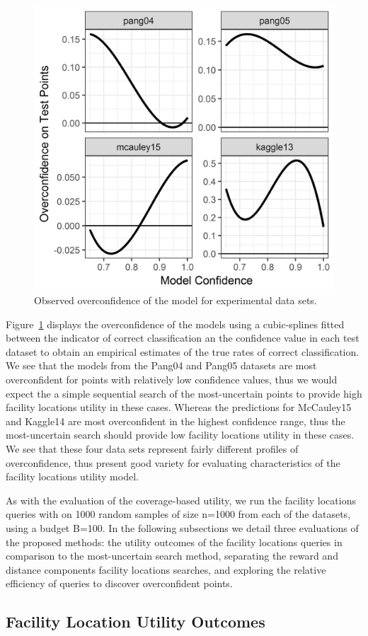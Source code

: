 \documentclass[letterpaper]{article} %
\newcommand{\km}[1]{{\color{red} #1}} %
\begin{document}
\begin{figure}[hbtp]
  \includegraphics[width=.45\textwidth]{../experimentsAndPlots/overconfidence.png}
  \caption{Observed overconfidence of the model for experimental data sets.}
  \label{fig:overconf}
\end{figure}

Figure~\ref{fig:overconf} displays the overconfidence of the models using a cubic-splines fitted between the indicator of correct classification an the confidence value in each test dataset to obtain an empirical estimates of the true rates of correct classification. We see that the models from the Pang04 and Pang05 datasets are most overconfident for points with relatively low confidence values, thus we would expect the a simple sequential search of the most-uncertain points to provide high facility locations utility in these cases. Whereas the predictions for McCauley15 and Kaggle14 are most overconfident in the highest confidence range, thus the most-uncertain search should provide low facility locations utility in these cases. We see that these four data sets represent fairly different profiles of overconfidence, thus present good variety for evaluating characteristics of the facility locations utility model. 

\km{As with the evaluation of the coverage-based utility, we run the facility locations queries with on 1000 random samples of size n=1000 from each of the datasets, using a budget B=100. In the following subsections we detail three evaluations of the proposed methods: the utility outcomes of the facility locations queries in comparison to the most-uncertain search method, separating the reward and distance components facility locations searches, and exploring the relative efficiency of queries to discover overconfident points.}

\subsection{Facility Location Utility Outcomes}
\end{document}
